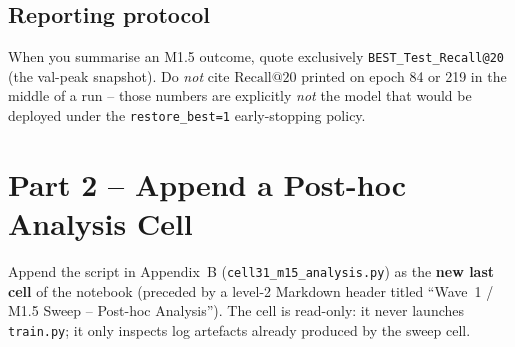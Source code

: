 \documentclass[11pt, a4paper]{article}
\begin{document}
\subsection*{Reporting protocol}
When you summarise an M1.5 outcome, quote exclusively
\texttt{BEST\_Test\_Recall@20} (the val-peak snapshot). Do \emph{not} cite
$\text{Recall@}20$ printed on epoch 84 or 219 in the middle of a run --
those numbers are explicitly \emph{not} the model that would be deployed under
the \texttt{restore\_best=1} early-stopping policy.

\section{Part 2 -- Append a Post-hoc Analysis Cell}
Append the script in Appendix~B (\texttt{cell31\_m15\_analysis.py}) as the
\textbf{new last cell} of the notebook (preceded by a level-2 Markdown header
titled ``Wave~1 / M1.5 Sweep -- Post-hoc Analysis''). The cell is read-only:
it never launches \texttt{train.py}; it only inspects log artefacts already
produced by the sweep cell.
\end{document}

